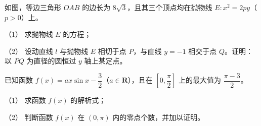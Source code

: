 \begin{question}
如图，等边三角形 $OAB$ 的边长为 $8\sqrt3$，且其三个顶点均在抛物线 $E:x^2=2py$（$p>0$）上。

（1） 求抛物线 $E$ 的方程；

（2） 设动直线 $l$ 与抛物线 $E$ 相切于点 $P$，与直线 $y=-1$ 相交于点 $Q$。证明：以 $PQ$ 为直径的圆恒过 $y$ 轴上某定点。
\nopagebreak[4]
\begin{center}\end{center}
\nopagebreak[4]
\end{question}
\begin{question}
已知函数 $f(x)=ax\sin x-\dfrac32$（$a\in\mathbf R$），且在 $\left[0,\dfrac\pi2\right]$ 上的最大值为 $\dfrac{\pi-3}{2}$。

（1） 求函数 $f(x)$ 的解析式；

（2） 判断函数 $f(x)$ 在 $(0,\pi)$ 内的零点个数，并加以证明。

\end{question}